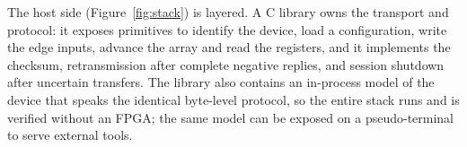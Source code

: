 The host side (Figure~\ref{fig:stack}) is layered. A C library owns the
transport and protocol: it exposes primitives to identify the device, load a
configuration, write the edge inputs, advance the array and read the registers,
and it implements the checksum, retransmission after complete negative replies,
and session shutdown after uncertain transfers. The library also contains
an in-process model of the device that speaks the identical byte-level
protocol, so the entire stack runs and is verified without an FPGA; the same
model can be exposed on a pseudo-terminal~\cite{stevens-apue} to serve external
tools.
